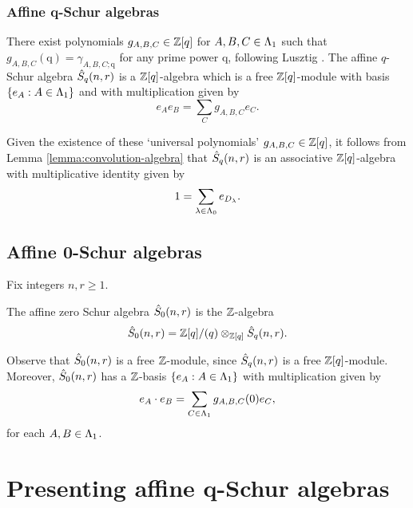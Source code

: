 \documentclass[a4paper, 11pt, twoside]{report}
\begin{document}
\subsection{Affine q-Schur algebras}

There exist polynomials $g_{A,B,C}\in\mathbb{Z}[q]$ for $A,B,C\in\Lambda_1{}$ such that $g_{A,B,C}(\mathrm{q}) = \gamma_{A,B,C;\mathrm{q}}$ for any prime power $\mathrm{q}$, following Lusztig \cite[Section 4]{lusztig99}. The affine $q$-Schur algebra $\hat{S}_q(n,r)$ is a $\mathbb{Z}[q]$-algebra which is a free $\mathbb{Z}[q]$-module with basis $\{e_A:A\in\Lambda_1{}\}$ and with multiplication given by
\begin{equation*}
e_A e_B = \sum_{C} g_{A,B,C}e_C.
\end{equation*}

Given the existence of these `universal polynomials' $g_{A,B,C}\in\mathbb{Z}[q]$, it follows from Lemma \ref{lemma:convolution-algebra} that $\hat{S}_q(n,r)$ is an associative $\mathbb{Z}[q]$-algebra with multiplicative identity given by
\begin{equation*}
1 = \sum_{\lambda\in\Lambda_0{}} e_{D_{\lambda}}.
\end{equation*}


\section{Affine 0-Schur algebras}

Fix integers $n,r\geq 1$.

\begin{definition}\label{definition:affine0schur}
The affine zero Schur algebra $\hat{S}_0(n,r)$ is the $\mathbb{Z}$-algebra
\begin{equation*}
\hat{S}_0(n,r) = \mathbb{Z}[q]/{(q)}\otimes_{\mathbb{Z}[q]}\hat{S}_q(n,r).
\end{equation*}
\end{definition}

Observe that $\hat{S}_0(n,r)$ is a free $\mathbb{Z}$-module, since $\hat{S}_q(n,r)$ is a free $\mathbb{Z}[q]$-module. Moreover, $\hat{S}_0(n,r)$ has a $\mathbb{Z}$-basis $\{e_A:A\in\Lambda_1{}\}$ with multiplication given by
\begin{equation*}
e_A\cdot e_B = \sum_{C\in\Lambda_1{}} g_{A,B,C}{(0)} e_C,
\end{equation*}
for each $A,B\in\Lambda_1{}$.


\chapter{Presenting affine q-Schur algebras}\label{chapter:presenting-q-schur}
\end{document}
